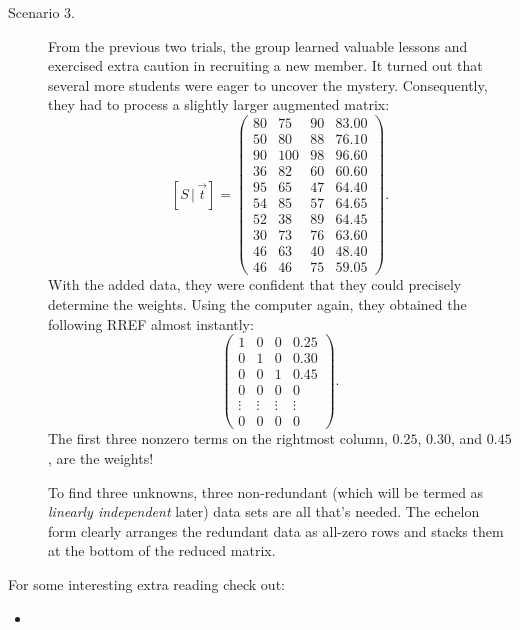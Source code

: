 \documentclass{ximera}
\begin{document}
\begin{example}
\begin{description}
  \item[Scenario 3.] From the previous two trials, the group learned
    valuable lessons and exercised extra caution in recruiting a new
    member. It turned out that several more students were eager to
    uncover the mystery. Consequently, they had to process a slightly
    larger augmented matrix:
    \[
      [S \,|\, \vec{t}] =
      \left(
        \begin{array}{ccc|c}
          80 & 75 & 90 & 83.00 \\
          50 & 80 & 88 & 76.10 \\
          90 & 100 & 98 & 96.60 \\
          36 & 82 & 60 & 60.60 \\
          95 & 65 & 47 & 64.40 \\
          54 & 85 & 57 & 64.65 \\
          52 & 38 & 89 & 64.45 \\
          30 & 73 & 76 & 63.60 \\
          46 & 63 & 40 & 48.40 \\
          46 & 46 & 75 & 59.05
        \end{array}
      \right).
    \]
    With the added data, they were confident that they could precisely
    determine the weights. Using the computer again, they
    obtained the following RREF almost instantly:
    \[
      \left(
        \begin{array}{ccc|c}
          1 & 0 & 0 & 0.25 \\
          0 & 1 & 0 & 0.30 \\
          0 & 0 & 1 & 0.45 \\
          0 & 0 & 0 & 0 \\
          \vdots & \vdots & \vdots & \vdots \\
          0 & 0 & 0 & 0
        \end{array}
      \right).
    \]
    The first three nonzero terms on the rightmost column, $0.25$,
    $0.30$, and $0.45$, are the weights!

    To find three unknowns, three non-redundant (which will be termed
    as \textit{linearly independent} later) data sets are all that's
    needed. The echelon form clearly arranges the redundant data as
    all-zero rows and stacks them at the bottom of the reduced matrix.
  \end{description}
\end{example}


For some interesting extra reading check out:
\begin{itemize}
\item {}
\end{itemize}
\end{document}
